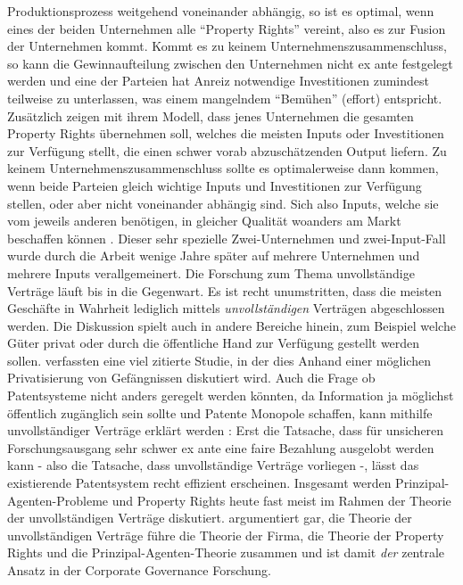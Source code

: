 Produktionsprozess weitgehend voneinander abhängig, so ist es optimal, wenn eines der beiden Unternehmen alle "`Property Rights"' vereint, also es zur Fusion der Unternehmen kommt. Kommt es zu keinem Unternehmenszusammenschluss, so kann die Gewinnaufteilung zwischen den Unternehmen nicht ex ante festgelegt werden und eine der Parteien hat Anreiz notwendige Investitionen zumindest teilweise zu unterlassen, was einem mangelndem "`Bemühen"' (effort) entspricht. Zusätzlich zeigen \textcite{Hart1986} mit ihrem Modell, dass jenes Unternehmen die gesamten Property Rights übernehmen soll, welches die meisten Inputs oder Investitionen zur Verfügung stellt, die einen schwer vorab abzuschätzenden Output liefern. Zu keinem Unternehmenszusammenschluss sollte es optimalerweise dann kommen, wenn beide Parteien gleich wichtige Inputs und Investitionen zur Verfügung stellen, oder aber nicht voneinander abhängig sind. Sich also Inputs, welche sie vom jeweils anderen benötigen, in gleicher Qualität woanders am Markt beschaffen können \parencite[S. 21]{Nobelpreis-Komitee2016}. Dieser sehr spezielle Zwei-Unternehmen und zwei-Input-Fall wurde durch die Arbeit \textcite{Hart1990} wenige Jahre später auf mehrere Unternehmen und mehrere Inputs verallgemeinert. 
Die Forschung zum Thema unvollständige Verträge läuft bis in die Gegenwart. Es ist recht unumstritten, dass die meisten Geschäfte in Wahrheit lediglich mittels \textit{unvollständigen} Verträgen abgeschlossen werden. Die Diskussion spielt auch in andere Bereiche hinein, zum Beispiel welche Güter privat oder durch die öffentliche Hand zur Verfügung gestellt werden sollen. \textcite{Hart1997} verfassten eine viel zitierte Studie, in der dies Anhand einer möglichen Privatisierung von Gefängnissen diskutiert wird. Auch die Frage ob Patentsysteme nicht anders geregelt werden könnten, da Information ja möglichst öffentlich zugänglich sein sollte und Patente Monopole schaffen, kann mithilfe unvollständiger Verträge erklärt werden \parencite{Tirole1999}: Erst die Tatsache, dass für unsicheren Forschungsausgang sehr schwer ex ante eine faire Bezahlung ausgelobt werden kann - also die Tatsache, dass unvollständige Verträge vorliegen -, lässt das existierende Patentsystem recht effizient erscheinen. Insgesamt werden Prinzipal-Agenten-Probleme und Property Rights heute fast meist im Rahmen der Theorie der unvollständigen Verträge \parencite{Shleifer1997} diskutiert. \textcite[S. 183]{Aghion2011} argumentiert gar, die Theorie der unvollständigen Verträge führe die Theorie der Firma, die Theorie der Property Rights und die Prinzipal-Agenten-Theorie zusammen und ist damit \textit{der} zentrale Ansatz in der Corporate Governance Forschung.


